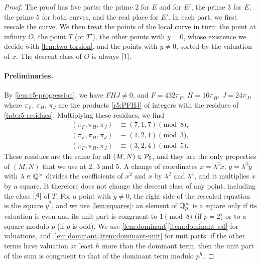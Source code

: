 \begin{proof}
The proof has five parts: the prime $2$ for $E$ and for $E'$, the prime $3$ for $E$, the prime $5$ for both curves, and the real place for $E'$. In each part, we first rescale the curve. We then treat the points of the local curve in turn: the point at infinity $O$, the point $T$ (or $T'$), the other points with $y=0$, whose existence we decide with \cref{lem:two-torsion}, and the points with $y\ne0$, sorted by the valuation of $x$. The descent class of $O$ is always $[1]$.

\paragraph{Preliminaries.} By \cref{lem:r5-progression}, we have $FHJ\ne0$, and $F=432\pi_F$, $H=16\pi_H$, $J=24\pi_J$, where $\pi_F$, $\pi_H$, $\pi_J$ are the products \eqref{r5:PFHJ} of integers with the residues of \cref{tab:r5-residues}. Multiplying these residues, we find
\begin{equation}\label{r5:P-residues}
\begin{aligned}
(\pi_F,\pi_H,\pi_J)&\equiv(7,1,7)\pmod8,\\
(\pi_F,\pi_H,\pi_J)&\equiv(1,2,1)\pmod3,\\
(\pi_F,\pi_H,\pi_J)&\equiv(3,2,4)\pmod5.
\end{aligned}
\end{equation}
These residues are the same for all $(M,N)\in\mathcal P_5$, and they are the only properties of $(M,N)$ that we use at $2$, $3$ and $5$. A change of coordinates $x=\lambda^2\tilde x$, $y=\lambda^3\tilde y$ with $\lambda\in\mathbb Q^\times$ divides the coefficients of $x^2$ and $x$ by $\lambda^2$ and $\lambda^4$, and it multiplies $x$ by a square. It therefore does not change the descent class of any point, including the class $[\beta]$ of $T$. For a point with $\tilde y\ne0$, the right side of the rescaled equation is the square $\tilde y^2$, and we use \cref{lem:squares}: an element of $\mathbb Q_p^\times$ is a square only if its valuation is even and its unit part is congruent to $1\pmod8$ (if $p=2$) or to a square modulo $p$ (if $p$ is odd). We use \cref{lem:dominant}\ref{item:dominant-val} for valuations, and \cref{lem:dominant}\ref{item:dominant-unit} for unit parts: if the other terms have valuation at least $h$ more than the dominant term, then the unit part of the sum is congruent to that of the dominant term modulo $p^h$.


\end{proof}
